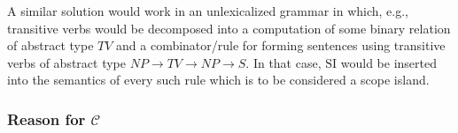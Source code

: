 A similar solution would work in an unlexicalized grammar in which, e.g.,
transitive verbs would be decomposed into a computation of some binary
relation of abstract type $TV$ and a combinator/rule for forming sentences
using transitive verbs of abstract type $NP \to TV \to NP \to S$. In that
case, $\mathrm{SI}$ would be inserted into the semantics of every
such rule which is to be considered a scope island.


\subsubsection{Reason for $\mathcal{C}$}
\label{sssec:reason-for-c}

